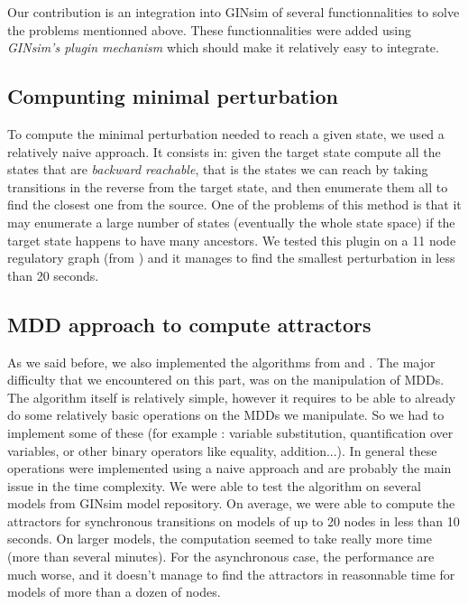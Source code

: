 \documentclass[a4paper,11pt]{article}
\begin{document}


Our contribution is an integration into GINsim of several functionnalities to
solve the problems mentionned above. These functionnalities were added using
\emph{GINsim's plugin mechanism} which should make it relatively easy to
integrate.

\subsection{Compunting minimal perturbation}
To compute the minimal perturbation needed to reach a given state, we used a
relatively naive approach. It consists in: given the target state compute all
the states that are \emph{backward reachable}, that is the states we can reach
by taking transitions in the reverse from the target state, and then enumerate
them all to find the closest one from the source. One of the problems of this
method is that it may enumerate a large number of states (eventually the whole
state space) if the target state happens to have many ancestors. We tested this
plugin on a 11 node regulatory graph (from \cite{Bonzanni}) and it manages to
find the smallest perturbation in less than 20 seconds.

\subsection{MDD approach to compute attractors}
As we said before, we also implemented the algorithms from \cite{Garg} and
\cite{Zheng}. The major difficulty that we encountered on this part, was on the
manipulation of MDDs. The algorithm itself is relatively simple, however it
requires to be able to already do some relatively basic operations on the MDDs
we manipulate. So we had to implement some of these (for example : variable
substitution, quantification over variables, or other binary operators like
equality, addition...). In general these operations were implemented using a
naive approach and are probably the main issue in the time complexity. We were
able to test the algorithm on several models from GINsim model repository. On
average, we were able to compute the attractors for synchronous transitions on
models of up to 20 nodes in less than 10 seconds. On larger models, the
computation seemed to take really more time (more than several minutes). For the
asynchronous case, the performance are much worse, and it doesn't manage to find
the attractors in reasonnable time for models of more than a dozen of nodes.
\end{document}
